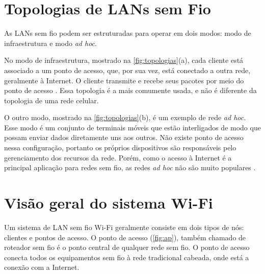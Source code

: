 \section{Topologias de LANs sem Fio}
\label{topologias-lans-sem-fio}

As LANs sem fio podem ser estruturadas para operar em dois modos: modo de infraestrutura e modo \textit{ad hoc}.

No modo de infraestrutura, mostrado na \autoref{fig:topologias}(a), cada cliente está associado a um ponto de acesso, que, por sua vez, está conectado a outra rede, geralmente à Internet. O cliente transmite e recebe seus pacotes por meio do ponto de acesso \cite{tanenbaum2011}. Essa topologia é a mais comumente usada, e não é diferente da topologia de uma rede celular.

O outro modo, mostrado na \autoref{fig:topologias}(b), é um exemplo de rede \textit{ad hoc}. Esse modo é um conjunto de terminais móveis que estão interligados de modo que possam enviar dados diretamente uns aos outros. Não existe ponto de acesso nessa configuração, portanto os próprios dispositivos são responsáveis pelo gerenciamento dos recursos da rede. Porém, como o acesso à Internet é a principal aplicação para redes sem fio, as redes \textit{ad hoc} não são muito populares \cite{tanenbaum2011}.

\begin{figure}[H]
	\centering
\end{figure}

\section{Visão geral do sistema Wi-Fi}
\label{sistema-wifi}

Um sistema de LAN sem fio Wi-Fi geralmente consiste em dois tipos de nós: clientes e pontos de acesso. O ponto de acesso (\autoref{fig:ap}), também chamado de roteador sem fio é o ponto central de qualquer rede sem fio. O ponto de acesso conecta todos os equipamentos sem fio à rede tradicional cabeada, onde está a conexão com a Internet.

